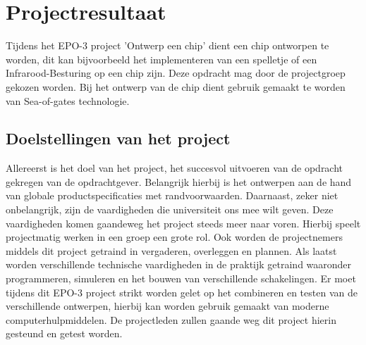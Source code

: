 \documentclass[oneside,dutch]{tudelft-report}
\begin{document}
\section{Projectresultaat}
Tijdens het EPO-3 project 'Ontwerp een chip' dient een chip ontworpen te worden, dit kan bijvoorbeeld het implementeren van een spelletje of een Infrarood-Besturing op een chip zijn. Deze opdracht mag door de projectgroep gekozen worden. Bij het ontwerp van de chip dient gebruik gemaakt te worden van Sea-of-gates technologie.

\subsection{Doelstellingen van het project}
Allereerst is het doel van het project, het succesvol uitvoeren van de opdracht gekregen van de opdrachtgever. Belangrijk hierbij is het ontwerpen aan de hand van globale productspecificaties met randvoorwaarden. Daarnaast, zeker niet onbelangrijk, zijn de vaardigheden die universiteit ons mee wilt geven. Deze vaardigheden komen gaandeweg het project steeds meer naar voren.  Hierbij speelt projectmatig werken in een groep een grote rol. Ook worden de projectnemers middels dit project getraind in vergaderen, overleggen en plannen. Als laatst worden verschillende technische vaardigheden in de praktijk getraind waaronder programmeren, simuleren en het bouwen van verschillende schakelingen. Er moet tijdens dit EPO-3 project strikt worden gelet op het combineren en testen van de verschillende ontwerpen, hierbij kan worden gebruik gemaakt van moderne computerhulpmiddelen. De projectleden zullen gaande weg dit project hierin gesteund en getest worden.  
\end{document}
